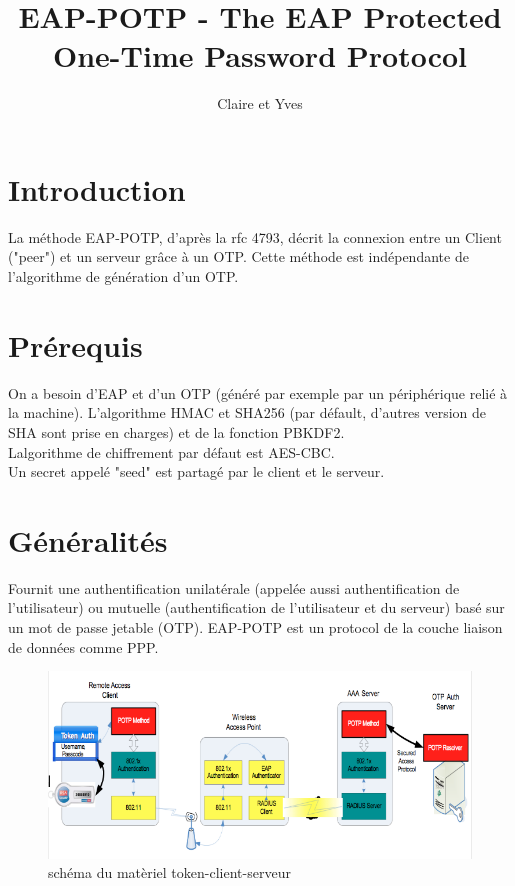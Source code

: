 \documentclass{article}
\title{EAP-POTP - The EAP Protected One-Time Password Protocol}
\author{Claire et Yves}
\begin{document}
\maketitle

\newpage
\tableofcontents
\newpage

\section{Introduction}
La méthode EAP-POTP, d'après la rfc 4793, décrit la connexion entre un Client ("peer") et un serveur grâce à un OTP.
Cette méthode est indépendante de l'algorithme de génération d'un OTP.

\section{Prérequis}
On a besoin d'EAP et d'un OTP (généré par exemple par un périphérique relié à la machine).
L'algorithme HMAC et SHA256 (par défault, d'autres version de SHA sont prise en charges) et de la fonction PBKDF2.\\
Lalgorithme de chiffrement par défaut est AES-CBC.\\

Un secret appelé "seed" est partagé par le client et le serveur.

\section{Généralités}
Fournit une authentification unilatérale (appelée aussi authentification de l'utilisateur) ou mutuelle (authentification de l'utilisateur et du serveur) basé sur un mot de passe jetable (OTP).
EAP-POTP est un protocol de la couche liaison de données comme PPP.

\begin{figure}[!h]
  \centering
  \includegraphics[width=400pt]{image2.png}
  \caption{schéma du matèriel token-client-serveur}
  \label{fig:image}
\end{figure}
\end{document}
